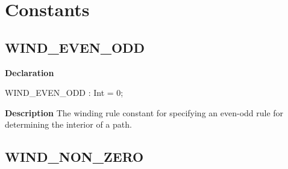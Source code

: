 \documentclass{report}
\newif\ifpdf
\begin{document}
\section{Constants}
\ifpdf
\subsection*{\large{\textbf{WIND{\_}EVEN{\_}ODD}}\normalsize\hspace{1ex}\hrulefill}
\else
\subsection*{WIND{\_}EVEN{\_}ODD}
\fi
\label{NewPascal.GUI.Geom-WIND_EVEN_ODD}
\begin{list}{}{
\setlength{\itemindent}{0cm}
\setlength{\listparindent}{0cm}
\setlength{\leftmargin}{\evensidemargin}
\addtolength{\leftmargin}{\tmplength}
\settowidth{\labelsep}{X}
\addtolength{\leftmargin}{\labelsep}
\setlength{\labelwidth}{\tmplength}
}
\item[\textbf{Declaration}\hfill]
\ifpdf
\begin{flushleft}
\fi
\begin{ttfamily}
WIND{\_}EVEN{\_}ODD  : Int = 0;\end{ttfamily}

\ifpdf
\end{flushleft}
\fi

\par
\item[\textbf{Description}]
The winding rule constant for specifying an even{-}odd rule for determining the interior of a path.

\end{list}
\ifpdf
\subsection*{\large{\textbf{WIND{\_}NON{\_}ZERO}}\normalsize\hspace{1ex}\hrulefill}
\else
\end{document}
